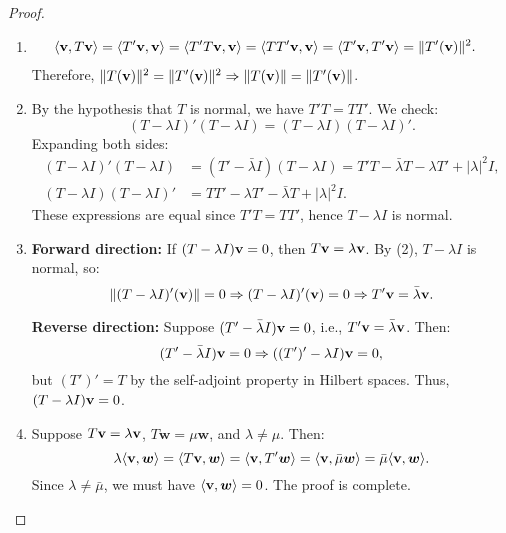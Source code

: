 \begin{proof}
\begin{enumerate}[label=\arabic*.]
\item
\begin{align*}
\langle {\bf v}, T{\bf v} \rangle &= \langle T'{\bf v}, {\bf v} \rangle = \langle T'T {\bf v}, {\bf v} \rangle = \langle TT'{\bf v}, {\bf v} \rangle = \langle T'{\bf v}, T'{\bf v} \rangle = \|T'({\bf v})\|^2.
\end{align*}
Therefore, \( \|T({\bf v})\|^2 = \|T'({\bf v})\|^2 \Rightarrow \|T({\bf v})\| = \|T'({\bf v})\| \).

\item
By the hypothesis that \( T \) is normal, we have \( T'T = TT' \). We check:
\[
(T - \lambda I)'(T - \lambda I) = (T - \lambda I)(T - \lambda I)'.
\]
Expanding both sides:
\begin{align*}
(T - \lambda I)'(T - \lambda I) &= (T' - \bar{\lambda} I)(T - \lambda I) = T'T - \bar{\lambda} T - \lambda T' + |\lambda|^2 I, \\
(T - \lambda I)(T - \lambda I)' &= T T' - \lambda T' - \bar{\lambda} T + |\lambda|^2 I.
\end{align*}
These expressions are equal since \( T'T = TT' \), hence \( T - \lambda I \) is normal.

\item
\textbf{Forward direction:} If \( (T - \lambda I){\bf v} = 0 \), then \( T{\bf v} = \lambda {\bf v} \). By (2), \( T - \lambda I \) is normal, so:
\[
\| (T - \lambda I)'({\bf v}) \| = 0 \Rightarrow (T - \lambda I)'({\bf v}) = 0 \Rightarrow T'{\bf v} = \bar{\lambda} {\bf v}.
\]

\textbf{Reverse direction:} Suppose \( (T' - \bar{\lambda} I){\bf v} = 0 \), i.e., \( T'{\bf v} = \bar{\lambda} {\bf v} \). Then:
\[
(T' - \bar{\lambda} I) {\bf v} = 0 \Rightarrow ((T')' - \lambda I) {\bf v} = 0,
\]
but \( (T')' = T \) by the self-adjoint property in Hilbert spaces. Thus, \( (T - \lambda I){\bf v} = 0 \).

\item
Suppose \( T{\bf v} = \lambda {\bf v} \), \( T\bm{w} = \mu \bm{w} \), and \( \lambda \neq \mu \). Then:
\[
\lambda \langle {\bf v}, \bm{w} \rangle = \langle T{\bf v}, \bm{w} \rangle = \langle {\bf v}, T'\bm{w} \rangle = \langle {\bf v}, \bar{\mu} \bm{w} \rangle = \bar{\mu} \langle {\bf v}, \bm{w} \rangle.
\]
Since \( \lambda \neq \bar{\mu} \), we must have \( \langle {\bf v}, \bm{w} \rangle = 0 \). The proof is complete.
\end{enumerate}
\end{proof}

